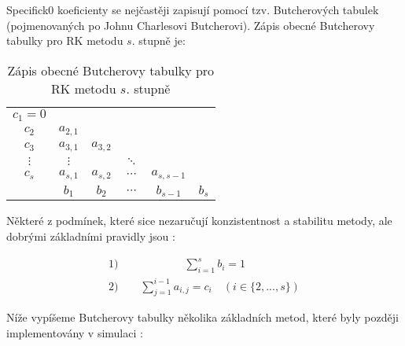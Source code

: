 Specifick0 koeficienty se nejčastěji zapisují pomocí tzv. Butcherových tabulek \cite{Butcher_tab_def} (pojmenovaných po Johnu Charlesovi Butcherovi). Zápis obecné Butcherovy tabulky pro RK metodu $s$. stupně je:
\begin{table}[!ht]
    \centering
    \captionsetup{singlelinecheck=off}
    \caption{Zápis obecné Butcherovy tabulky pro RK metodu $s$. stupně}
    \label{tab:Butch_tab}

    \begin{tabularx}{7cm}{c | c c c c c}
        $c_1 = 0$                                                            \\
        $c_2$    & $a_{2, 1}$                                                \\
        $c_3$    & $a_{3, 1}$ & $a_{3, 2}$                                   \\
        $\vdots$ & $\vdots$   &            & $\ddots$                        \\
        $c_s$    & $a_{s, 1}$ & $a_{s, 2}$ & $\cdots$ & $a_{s, s-1}$         \\
        \hline
                 & $b_1$      & $b_2$      & $\cdots$ & $b_{s-1}$    & $b_s$ \\
    \end{tabularx}
\end{table}

Některé z podmínek, které sice nezaručují konzistentnost a stabilitu metody, ale dobrými základními pravidly jsou \cite{Butcher_tab_def}:

\begin{equation}
    \label{eq:RK_conditions}
    \begin{gathered}
        \text{1)} \quad \quad \qquad \qquad \sum_{i=1}^{s} b_i = 1 \qquad \qquad \\
        \text{2)} \quad \quad \sum_{j=1}^{i-1} a_{i,j} = c_i \quad (i \in \{2,...,s\})
    \end{gathered}
\end{equation}

Níže vypíšeme Butcherovy tabulky několika základních metod, které byly později implementovány v simulaci \cite{RK_methods_list}:

